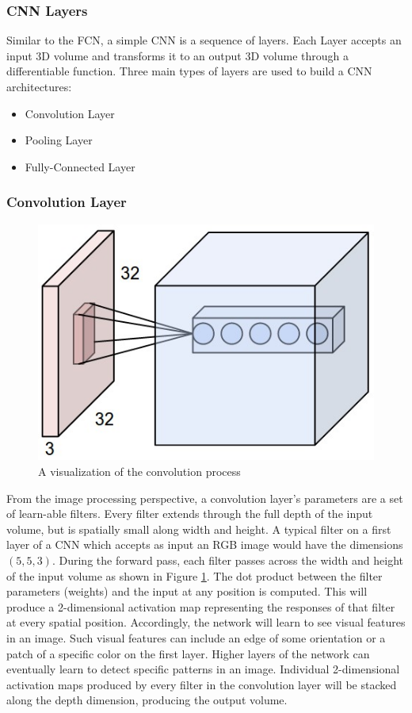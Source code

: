 \subsubsection{CNN Layers}
Similar to the FCN, a simple CNN is a sequence of layers. Each Layer accepts an input 3D volume and transforms it to an output 3D volume through a differentiable function. Three main types of layers are used to build a CNN architectures: 
\begin{itemize}
\item Convolution Layer
\item Pooling Layer
\item Fully-Connected Layer
\end{itemize}
\subsubsection{Convolution Layer}
\begin{figure}[ht]
\includegraphics[trim={0cm 0cm 0cm 0cm},clip,width=0.7\linewidth]{Figures/depthcol.jpeg}
\centering
\caption{A visualization of the convolution process}
\label{conv}
\end{figure}
From the image processing perspective, a convolution layer’s parameters are a set of learn-able filters. Every filter extends through the full depth of the input volume, but is spatially small along width and height. A typical filter on a first layer of a CNN which accepts as input an RGB image would have the dimensions \((5,5,3)\). During the forward pass, each filter passes across the width and height of the input volume as shown in Figure \ref{conv}. The dot product between the filter parameters (weights) and the input at any position is computed. This will produce a 2-dimensional activation map representing the responses of that filter at every spatial position. Accordingly, the network will learn to see visual features in an image. Such visual features can include an edge of some orientation or a patch of a specific color on the first layer. Higher layers of the network can eventually learn to detect specific patterns in an image. Individual 2-dimensional activation maps produced by every filter in the convolution layer will be stacked along the depth dimension, producing the output volume.

